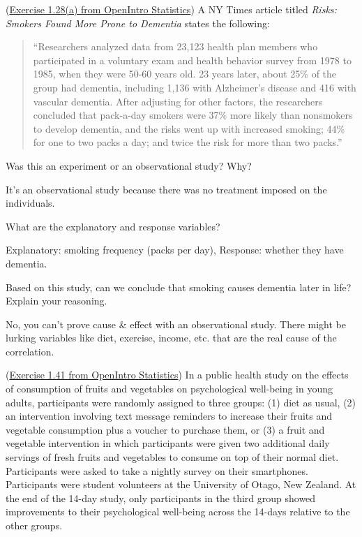 \documentclass[12pt,answers]{exam}
\newcounter{countA}
\begin{document}
\begin{questions}
\setcounter{question}{\value{countA}}
\item (\href{http://people.hsc.edu/faculty-staff/blins/books/OpenIntroStats4e.pdf\#eoce.1.28}{Exercise 1.28(a) from OpenIntro Statistics}) A NY Times article titled \emph{Risks: Smokers Found More Prone to Dementia} states the following:

\begin{quote}
``Researchers analyzed data from 23,123 health plan members who
participated in a voluntary exam and health behavior survey from 1978 to
1985, when they were 50-60 years old. 23 years later, about 25\% of the
group had dementia, including 1,136 with Alzheimer's disease and 416
with vascular dementia. After adjusting for other factors, the
researchers concluded that pack-a-day smokers were 37\% more likely than
nonsmokers to develop dementia, and the risks went up with increased
smoking; 44\% for one to two packs a day; and twice the risk for more
than two packs.''
\end{quote}

\begin{parts}
\item
  Was this an experiment or an observational study? Why?
\begin{solution}
It's an observational study because there was no treatment imposed on the individuals. 
\end{solution}
\vfill
\item
  What are the explanatory and response variables?
\begin{solution}
Explanatory: smoking frequency (packs per day), Response: whether they have dementia.
\end{solution}
\vfill
\item
  Based on this study, can we conclude that smoking causes dementia
  later in life? Explain your reasoning.
\vfill
\begin{solution}
No, you can't prove cause \& effect with an observational study. There might be lurking variables like diet, exercise, income, etc. that are the real cause of the correlation. 
\end{solution}
\end{parts}


\question
  (\href{http://people.hsc.edu/faculty-staff/blins/books/OpenIntroStats4e.pdf\#eoce.1.41}{Exercise 1.41 from OpenIntro Statistics}) In a public health study on the effects of consumption of fruits and
  vegetables on psychological well-being in young adults, participants
  were randomly assigned to three groups: (1) diet as usual, (2) an
  intervention involving text message reminders to increase their fruits
  and vegetable consumption plus a voucher to purchase them, or (3) a
  fruit and vegetable intervention in which participants were given two
  additional daily servings of fresh fruits and vegetables to consume on
  top of their normal diet. Participants were asked to take a nightly
  survey on their smartphones. Participants were student volunteers at
  the University of Otago, New Zealand. At the end of the 14-day study,
  only participants in the third group showed improvements to their
  psychological well-being across the 14-days relative to the other
  groups.


\end{questions}
\end{document}
